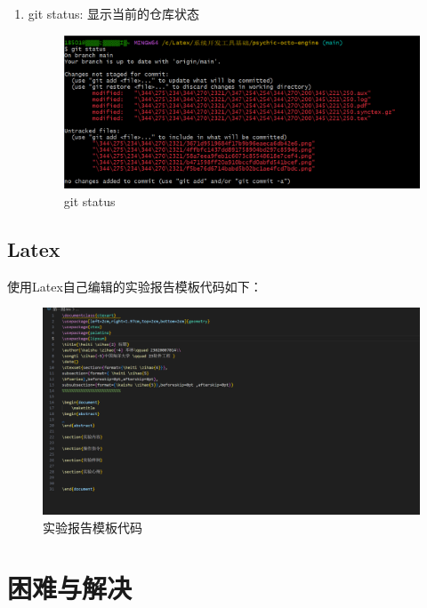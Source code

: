 \documentclass{ctexart}
\begin{document}
\begin{enumerate}
  \vspace{-5pt}\item git status: 显示当前的仓库状态
   \begin{figure}[H]
      \centering
      \includegraphics[width=16cm]{31e2ac4160721560e1f8289f0edcd5fd.png}
      \caption{git status}
      \label{fig:111}
  \end{figure}
\end{enumerate}


\subsection{Latex}
使用Latex自己编辑的实验报告模板代码如下：
\begin{figure}[H]
    \centering
    \includegraphics[width=19cm]{20240830000426.png}
    \caption{实验报告模板代码}
    \label{fig:16}
\end{figure}
\section{困难与解决}
\end{document}
